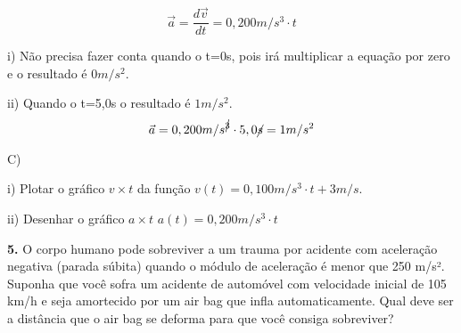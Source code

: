 \documentclass[a4paper, 12pt]{article}
\begin{document}
\begin{flushleft}
		\begin{equation*}
			\vec{a} = \dfrac{d\vec{v}}{dt} = 0,200m/s^3 \cdot t
		\end{equation*}
		
		i) Não precisa fazer conta quando o t=0s, pois irá multiplicar a equação por zero e o resultado é $0m/s^2$.
		
		ii) Quando o t=5,0s o resultado é $1m/s^2$.
		\begin{equation*}
			\vec{a} = 0,200m/s^{\cancel{3}} \cdot 5,0\cancel{s} = 1m/s^2
		\end{equation*}
		
		C)  
		
		i) Plotar o gráfico $v \times t$ da função $v(t)=0,100m/s^3 \cdot t+3m/s$.
		\begin{center}
		\end{center}
		
		ii) Desenhar o gráfico $a \times t$ $a(t) = 0,200m/s^3 \cdot t$
		\begin{center}
		\end{center}
		
		\vspace{2em}
		
		\textbf{5.} O corpo humano pode sobreviver a um trauma por acidente com aceleração negativa (parada súbita) quando o módulo de aceleração é menor que 250 m/s². Suponha que você sofra um acidente de automóvel com velocidade inicial de 105 km/h e seja amortecido por um air bag que infla automaticamente. Qual deve ser a distância que o air bag se deforma para que você consiga sobreviver?
		

\end{flushleft}
\end{document}
